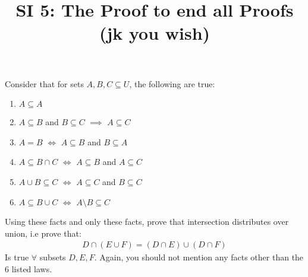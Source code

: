 \documentclass[12pt]{article}
\date{}
\author{}
\title{SI 5: The Proof to end all Proofs (jk you wish)}
\begin{document}
	\maketitle
	Consider that for sets $A,B,C \subseteq U$, the following are true:
	
	\begin{enumerate}
		\item $A \subseteq A$
		\item $A \subseteq B$ and $B \subseteq C$ $\implies$ $ A \subseteq C$
		\item $A = B$ $\iff$ $A\subseteq B$ and $B\subseteq A$
		\item $A \subseteq B \cap C$ $\iff$ $ A \subseteq B$ and $A \subseteq C$
		\item $A \cup B \subseteq C$ $\iff$ $A\subseteq C$ and $B \subseteq C$
		\item $A \subseteq B \cup C$ $\iff$ $A \setminus B \subseteq C$
	\end{enumerate}
	Using these facts and only these facts, prove that intersection distributes over union, i.e prove that:
	\begin{align*}
		D \cap (E \cup F) = (D \cap E) \cup (D \cap F)
	\end{align*}
	Is true $\forall$ subsets $D,E,F$. Again, you should not mention any facts other than the 6 listed laws.
\end{document}
